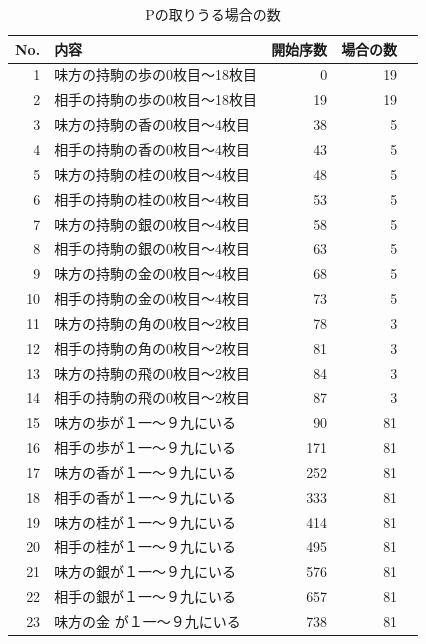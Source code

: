 \documentclass[11pt,a4paper]{ltjsarticle}
\begin{document}
\begin{table}
  \footnotesize
  \centering
  \caption{Pの取りうる場合の数}
  \begin{threeparttable}
  \begin{tabular}{rlrrr}
    No. & 内容                            & 開始序数 & 場合の数 \\
    \hline
     1 & 味方の持駒の歩の0枚目～18枚目     &    0 & 19 \\
     2 & 相手の持駒の歩の0枚目～18枚目     &   19 & 19 \\
     3 & 味方の持駒の香の0枚目～4枚目      &   38 &  5 \\
     4 & 相手の持駒の香の0枚目～4枚目      &   43 &  5 \\
     5 & 味方の持駒の桂の0枚目～4枚目      &   48 &  5 \\
     6 & 相手の持駒の桂の0枚目～4枚目      &   53 &  5 \\
     7 & 味方の持駒の銀の0枚目～4枚目      &   58 &  5 \\
     8 & 相手の持駒の銀の0枚目～4枚目      &   63 &  5 \\
     9 & 味方の持駒の金の0枚目～4枚目      &   68 &  5 \\
    10 & 相手の持駒の金の0枚目～4枚目      &   73 &  5 \\
    11 & 味方の持駒の角の0枚目～2枚目      &   78 &  3 \\
    12 & 相手の持駒の角の0枚目～2枚目      &   81 &  3 \\
    13 & 味方の持駒の飛の0枚目～2枚目      &   84 &  3 \\
    14 & 相手の持駒の飛の0枚目～2枚目      &   87 &  3 \\
    15 & 味方の歩が１一〜９九にいる        &   90 & 81 \\
    16 & 相手の歩が１一〜９九にいる        &  171 & 81 \\
    17 & 味方の香が１一〜９九にいる        &  252 & 81 \\
    18 & 相手の香が１一〜９九にいる        &  333 & 81 \\
    19 & 味方の桂が１一〜９九にいる        &  414 & 81 \\
    20 & 相手の桂が１一〜９九にいる        &  495 & 81 \\
    21 & 味方の銀が１一〜９九にいる        &  576 & 81 \\
    22 & 相手の銀が１一〜９九にいる        &  657 & 81 \\
    23 & 味方の金\tnote{*} が１一〜９九にいる &  738 & 81 \\

\end{tabular}
\end{threeparttable}
\end{table}
\end{document}
